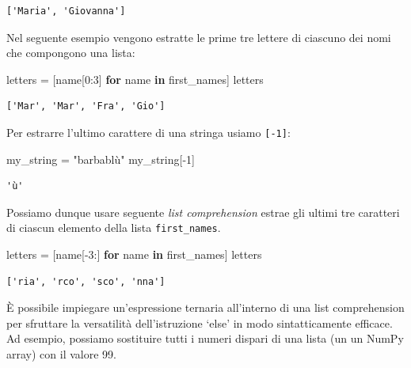 \documentclass[
  letterpaper,
  krantz2]{{[}./krantz{]}}
\newenvironment{Shaded}{\begin{snugshade}}{\end{snugshade}}
\newcommand{\ControlFlowTok}[1]{\textcolor[rgb]{0.00,0.23,0.31}{\textbf{#1}}}
\newcommand{\DecValTok}[1]{\textcolor[rgb]{0.68,0.00,0.00}{#1}}
\newcommand{\KeywordTok}[1]{\textcolor[rgb]{0.00,0.23,0.31}{\textbf{#1}}}
\newcommand{\NormalTok}[1]{\textcolor[rgb]{0.00,0.23,0.31}{#1}}
\newcommand{\OperatorTok}[1]{\textcolor[rgb]{0.37,0.37,0.37}{#1}}
\newcommand{\StringTok}[1]{\textcolor[rgb]{0.13,0.47,0.30}{#1}}
\begin{document}
\begin{verbatim}
['Maria', 'Giovanna']
\end{verbatim}

Nel seguente esempio vengono estratte le prime tre lettere di ciascuno
dei nomi che compongono una lista:

\begin{Shaded}
\begin{Highlighting}[]
\NormalTok{letters }\OperatorTok{=}\NormalTok{ [name[}\DecValTok{0}\NormalTok{:}\DecValTok{3}\NormalTok{] }\ControlFlowTok{for}\NormalTok{ name }\KeywordTok{in}\NormalTok{ first\_names] }
\NormalTok{letters}
\end{Highlighting}
\end{Shaded}

\begin{verbatim}
['Mar', 'Mar', 'Fra', 'Gio']
\end{verbatim}

Per estrarre l'ultimo carattere di una stringa usiamo \texttt{{[}-1{]}}:

\begin{Shaded}
\begin{Highlighting}[]
\NormalTok{my\_string }\OperatorTok{=} \StringTok{"barbablù"}
\NormalTok{my\_string[}\OperatorTok{{-}}\DecValTok{1}\NormalTok{]}
\end{Highlighting}
\end{Shaded}

\begin{verbatim}
'ù'
\end{verbatim}

Possiamo dunque usare seguente \emph{list comprehension} estrae gli
ultimi tre caratteri di ciascun elemento della lista
\texttt{first\_names}.

\begin{Shaded}
\begin{Highlighting}[]
\NormalTok{letters }\OperatorTok{=}\NormalTok{ [name[}\OperatorTok{{-}}\DecValTok{3}\NormalTok{:] }\ControlFlowTok{for}\NormalTok{ name }\KeywordTok{in}\NormalTok{ first\_names] }
\NormalTok{letters}
\end{Highlighting}
\end{Shaded}

\begin{verbatim}
['ria', 'rco', 'sco', 'nna']
\end{verbatim}

È possibile impiegare un'espressione ternaria all'interno di una list
comprehension per sfruttare la versatilità dell'istruzione `else' in
modo sintatticamente efficace. Ad esempio, possiamo sostituire tutti i
numeri dispari di una lista (un un NumPy array) con il valore 99.
\end{document}
